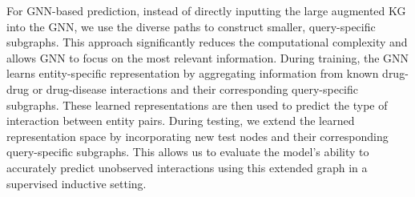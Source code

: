  \label{gnn-learning}
For GNN-based prediction, instead of directly inputting the large augmented KG into the GNN, we use the diverse paths to construct smaller, query-specific subgraphs.
This approach significantly reduces the computational complexity and allows GNN to focus on the most relevant information.
During training, the GNN learns entity-specific representation by aggregating information from known drug-drug or drug-disease interactions and their corresponding query-specific subgraphs. 
These learned representations are then used to predict the type of interaction between entity pairs.  
During testing, we extend the learned representation space by incorporating new test nodes and their corresponding query-specific subgraphs.
This allows us to evaluate the model's ability to accurately predict unobserved interactions using this extended graph in a supervised inductive setting.

